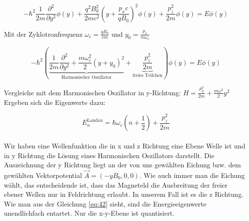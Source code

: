 \[ - \hbar^2\frac{1}{2m} \frac{\partial^2}{\partial y^2}\phi(y) + \frac{q^2 B_0^2}{2mc^2} (y +  \frac{p_xc}{qB_0} )^2\phi(y) +\frac{p_z^2}{2m}\phi(y)  = E \phi(y) \]


Mit der Zyklotronfrequenz \( \omega_c = \frac{qB_0}{cm} \) und \(y_0 = \frac{p_x}{m\omega_c}\)

\[  - \hbar^2\left( \underbrace{ \frac{1}{2m} \frac{\partial^2}{\partial y^2} + \frac{m\omega_c^2}{2} (y +  y_0 )^2}_{\text{Harmonischer Oszillator}} +\underbrace{ \frac{p_z^2}{2m}}_{\text{freies Teilchen}}  \right)\phi(y) = E \phi(y) \]


Vergleiche mit dem Harmonischen Oszillator in y-Richtung: \( H = \frac{p^2_y}{2m} + \frac{m\omega^2}{2}y^2 \) Ergeben sich die Eigenwerte dazu:

\begin{equation}
\label{eq:42}
 \boxed{E_n^{\text{Landau}} = \hbar\omega_c(n+\frac{1}{2}) + \frac{p_z^2}{2m} }
\end{equation}
\\
Wir haben eine Wellenfunktion die in x und z Richtung eine Ebene Welle ist und in y Richtung die Lösung eines Harmonischen Oszillators darstellt. Die Auszeichnung der y Richtung liegt an der von uns gewählten Eichung bzw. dem gewählten Vektorpotential  \(\vec A = (-yB_0,0,0)\). Wie auch immer man die Eichung wählt, das entscheidende ist, dass das Magneteld die Ausbreitung der freier ebener Wellen nur in Feldrichtung erlaubt. In unserem Fall ist es die z Richtung. Wie man aus der Gleichung \eqref{eq:42} sieht, sind die Energieeigenwerte unendlichfach entartet. Nur die x-y-Ebene ist quantisiert.





